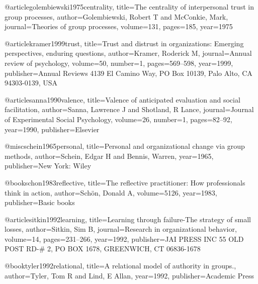 @article{golembiewski1975centrality,
  title={The centrality of interpersonal trust in group processes},
  author={Golembiewski, Robert T and McConkie, Mark},
  journal={Theories of group processes},
  volume={131},
  pages={185},
  year={1975}
}

@article{kramer1999trust,
  title={Trust and distrust in organizations: Emerging perspectives, enduring questions},
  author={Kramer, Roderick M},
  journal={Annual review of psychology},
  volume={50},
  number={1},
  pages={569--598},
  year={1999},
  publisher={Annual Reviews 4139 El Camino Way, PO Box 10139, Palo Alto, CA 94303-0139, USA}
}

@article{sanna1990valence,
  title={Valence of anticipated evaluation and social facilitation},
  author={Sanna, Lawrence J and Shotland, R Lance},
  journal={Journal of Experimental Social Psychology},
  volume={26},
  number={1},
  pages={82--92},
  year={1990},
  publisher={Elsevier}
}

@misc{schein1965personal,
  title={Personal and organizational change via group methods},
  author={Schein, Edgar H and Bennis, Warren},
  year={1965},
  publisher={New York: Wiley}
}

@book{schon1983reflective,
  title={The reflective practitioner: How professionals think in action},
  author={Sch{\"o}n, Donald A},
  volume={5126},
  year={1983},
  publisher={Basic books}
}

@article{sitkin1992learning,
  title={Learning through failure-The strategy of small losses},
  author={Sitkin, Sim B},
  journal={Research in organizational behavior},
  volume={14},
  pages={231--266},
  year={1992},
  publisher={JAI PRESS INC 55 OLD POST RD-\# 2, PO BOX 1678, GREENWICH, CT 06836-1678}
}

@book{tyler1992relational,
  title={A relational model of authority in groups.},
  author={Tyler, Tom R and Lind, E Allan},
  year={1992},
  publisher={Academic Press}
}